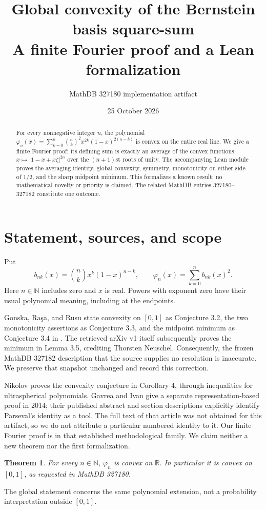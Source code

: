 \documentclass[11pt]{article}
\title{Global convexity of the Bernstein basis square-sum\\
\large A finite Fourier proof and a Lean formalization}
\author{MathDB 327180 implementation artifact}
\date{25 October 2026}
\newtheorem{theorem}{Theorem}
\newcommand{\R}{\mathbb R}
\newcommand{\N}{\mathbb N}
\newcommand{\ph}{\varphi}
\begin{document}
\maketitle
\begin{abstract}
For every nonnegative integer $n$, the polynomial
$\ph_n(x)=\sum_{k=0}^n\binom nk^2x^{2k}(1-x)^{2(n-k)}$
is convex on the entire real line. We give a finite Fourier proof: its defining
sum is exactly an average of the convex functions
$x\mapsto |1-x+x\zeta|^{2n}$ over the $(n+1)$st roots of unity.
The accompanying Lean module proves the averaging identity, global convexity,
symmetry, monotonicity on either side of $1/2$, and the sharp midpoint minimum.
This formalizes a known result; no mathematical novelty or priority is claimed.
The related MathDB entries 327180--327182 constitute one outcome.
\end{abstract}

\section{Statement, sources, and scope}
Put
\[
 b_{nk}(x)=\binom nk x^k(1-x)^{n-k},\qquad
 \ph_n(x)=\sum_{k=0}^n b_{nk}(x)^2 .
\]
Here $n\in\N$ includes zero and $x$ is real. Powers with exponent zero
have their usual polynomial meaning, including at the endpoints.

Gonska, Ra\c{s}a, and Rusu state convexity on $[0,1]$ as Conjecture 3.2,
the two monotonicity assertions as Conjecture 3.3, and the midpoint minimum
as Conjecture 3.4 in \cite{GRR}. The retrieved arXiv v1 itself subsequently
proves the minimum in Lemma 3.5, crediting Thorsten Neuschel. Consequently,
the frozen MathDB 327182 description that the source supplies no resolution
is inaccurate. We preserve that snapshot unchanged and record this correction.

Nikolov \cite{Nikolov} proves the convexity conjecture in Corollary 4,
through inequalities for ultraspherical polynomials. Gavrea and Ivan
\cite{GI} give a separate representation-based proof in 2014; their
published abstract and section descriptions explicitly identify Parseval's
identity as a tool. The full text of that article was not obtained for this
artifact, so we do not attribute a particular numbered identity to it.
Our finite Fourier proof is in that established methodological family.
We claim neither a new theorem nor the first formalization.

\begin{theorem}\label{thm:main}
For every $n\in\N$, $\ph_n$ is convex on $\R$. In particular it is
convex on $[0,1]$, as requested in MathDB 327180.
\end{theorem}
The global statement concerns the same polynomial extension, not a
probability interpretation outside $[0,1]$.
\end{document}
